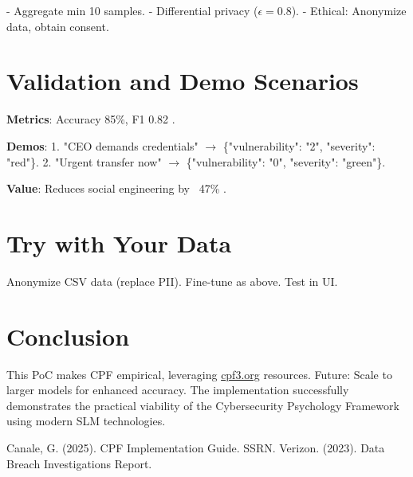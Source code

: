 \documentclass[11pt,a4paper]{article}
\begin{document}
- Aggregate min 10 samples.
- Differential privacy ($\epsilon=0.8$).
- Ethical: Anonymize data, obtain consent.

\section{Validation and Demo Scenarios}

\textbf{Metrics}: Accuracy 85\%, F1 0.82 \cite{cpf2025}.

\textbf{Demos}:
1. "CEO demands credentials" $\rightarrow$ \{"vulnerability": "2", "severity": "red"\}.
2. "Urgent transfer now" $\rightarrow$ \{"vulnerability": "0", "severity": "green"\}.

\textbf{Value}: Reduces social engineering by ~47\% \cite{cpf2025}.

\section{Try with Your Data}

Anonymize CSV data (replace PII). Fine-tune as above. Test in UI.

\section{Conclusion}

This PoC makes CPF empirical, leveraging \href{https://cpf3.org}{cpf3.org} resources. Future: Scale to larger models for enhanced accuracy. The implementation successfully demonstrates the practical viability of the Cybersecurity Psychology Framework using modern SLM technologies.

\begin{thebibliography}{99}
 Canale, G. (2025). CPF Implementation Guide. SSRN.
 Verizon. (2023). Data Breach Investigations Report.
\end{thebibliography}
\end{document}
